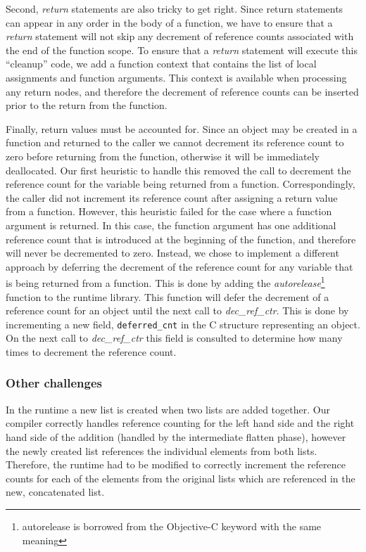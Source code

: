 \documentclass{sigplanconf}
\newcommand{\afunction}[1]{\textit{#1}}
\newcommand{\afield}[1]{\texttt{#1}}
\begin{document}
Second, \afunction{return} statements are also tricky to get right.  Since return statements can appear in any order in the body of a function, we have to ensure that a \afunction{return} statement will not skip any decrement of reference counts associated with the end of the function scope.  To ensure that a \afunction{return} statement will execute this ``cleanup'' code, we add a function context that contains the list of local assignments and function arguments.  This context is available when processing any return nodes, and therefore the decrement of reference counts can be inserted prior to the return from the function.  

Finally, return values must be accounted for.  Since an object may be created in a function and returned to the caller we cannot decrement its reference count to zero before returning from the function, otherwise it will be immediately deallocated.  Our first heuristic to handle this removed the call to decrement the reference count for the variable being returned from a function.  Correspondingly, the caller did not increment its reference count after assigning a return value from a function.  However, this heuristic failed for the case where a function argument is returned.  In this case, the function argument has one additional reference count that is introduced at the beginning of the function, and therefore will never be decremented to zero.  Instead, we chose to implement a different approach by deferring the decrement of the reference count for any variable that is being returned from a function.  This is done by adding the \afunction{autorelease}\footnote{autorelease is borrowed from the Objective-C keyword with the same meaning} function to the runtime library.  This function will defer the decrement of a reference count for an object until the next call to \afunction{dec\_ref\_ctr}.  This is done by incrementing a new field, \afield{deferred\_cnt} in the C structure representing an object.  On the next call to \afunction{dec\_ref\_ctr} this field is consulted to determine how many times to decrement the reference count.

\subsubsection{Other challenges}
In the runtime a new list is created when two lists are added together.  Our compiler correctly handles reference counting for the left hand side and the right hand side of the addition (handled by the intermediate flatten phase), however the newly created list references the individual elements from both lists.  Therefore, the runtime had to be modified to correctly increment the reference counts for each of the elements from the original lists which are referenced in the new, concatenated list.
\end{document}
